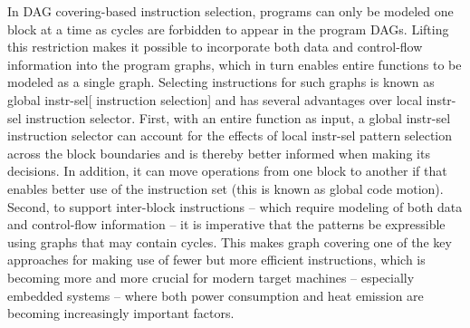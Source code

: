 %
%
%
In \gls{DAG covering}-based \gls{instruction selection}, \glspl{program} can
only be modeled one \gls{block} at a time as \glspl{cycle} are forbidden to
appear in the \glspl{program DAG}.
%
Lifting this restriction makes it possible to
incorporate both data and control-flow information into the \glspl{program
  graph}, which in turn enables entire \glspl{function} to be modeled as a
single \gls{graph}.
%
Selecting \glspl{instruction} for such \glspl{graph} is
known as \gls{global instr-sel}[ \gls{instruction selection}] and has several
advantages over \gls{local instr-sel} \gls{instruction selector}.
%
First, with an
entire \gls{function} as input, a \gls{global instr-sel} \gls{instruction
  selector} can account for the effects of \gls{local instr-sel} \gls{pattern
  selection} across the \gls{block} boundaries and is thereby better informed
when making its decisions.
%
In addition, it can move operations from one
\gls{block} to another if that enables better use of the \gls{instruction set}
(this is known as \gls{global code motion}).
%
Second, to support
\glspl{inter-block instruction} -- which require modeling of both data and
control-flow information -- it is imperative that the \glspl{pattern} be
expressible using \glspl{graph} that may contain \glspl{cycle}.
%
This makes
\gls{graph covering} one of the key approaches for making use of fewer but more
efficient \glspl{instruction}, which is becoming more and more crucial for
modern \glspl{target machine} -- especially embedded systems -- where both power
consumption and heat emission are becoming increasingly important factors.

